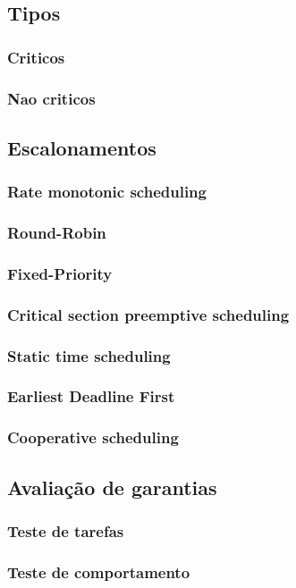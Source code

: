 \documentclass{article}
\begin{document}
		\subsection{Tipos}
		\subsubsection{Criticos}
		\subsubsection{Nao criticos}
		\subsection{Escalonamentos}
		\subsubsection{Rate monotonic scheduling}
		\subsubsection{Round-Robin}
		\subsubsection{Fixed-Priority}
		\subsubsection{Critical section preemptive scheduling}
		\subsubsection{Static time scheduling}
		\subsubsection{Earliest Deadline First}
		\subsubsection{Cooperative scheduling}

	\subsection{Avaliação de garantias}
		\subsubsection{Teste de tarefas}
		\subsubsection{Teste de comportamento}
\end{document}
